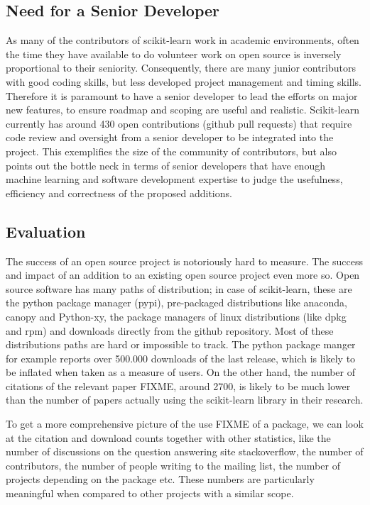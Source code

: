 \subsection{Need for a Senior Developer}
As many of the contributors of scikit-learn work in academic environments,
often the time they have available to do volunteer work on open source is
inversely proportional to their seniority.
Consequently, there are many junior contributors with good coding skills,
but less developed project management and timing skills.
Therefore it is paramount to have a senior developer to lead the efforts
on major new features, to ensure roadmap and scoping are useful and realistic.
Scikit-learn currently has around 430 open contributions (github pull requests)
that require code review and oversight from a senior developer to be integrated
into the project. This exemplifies the size of the community of contributors,
but also points out the bottle neck in terms of senior developers that
have enough machine learning and software development expertise to judge
the usefulness, efficiency and correctness of the proposed additions.


\subsection{Evaluation}
The success of an open source project is notoriously hard to measure. The
success and impact of an addition to an existing open source project even more
so. Open source software has many paths of distribution; in case of scikit-learn,
these are the python package manager (pypi), pre-packaged distributions like
anaconda, canopy and Python-xy, the package managers of linux distributions (like dpkg and rpm)
and downloads directly from the github repository. Most of these distributions paths are hard
or impossible to track. The python package manger for example reports over 500.000 downloads of the last
release, which is likely to be inflated when taken as a measure of users.
On the other hand, the number of citations of the relevant paper FIXME, around
2700, is likely to be much lower than the number of papers actually using the
scikit-learn library in their research.

To get a more comprehensive picture of the use FIXME of a package, we can look
at the citation and download counts together with other statistics, like the
number of discussions on the question answering site stackoverflow, the number
of contributors, the number of people writing to the mailing list, the number
of projects depending on the package etc.
These numbers are particularly meaningful when compared to other projects with
a similar scope.

